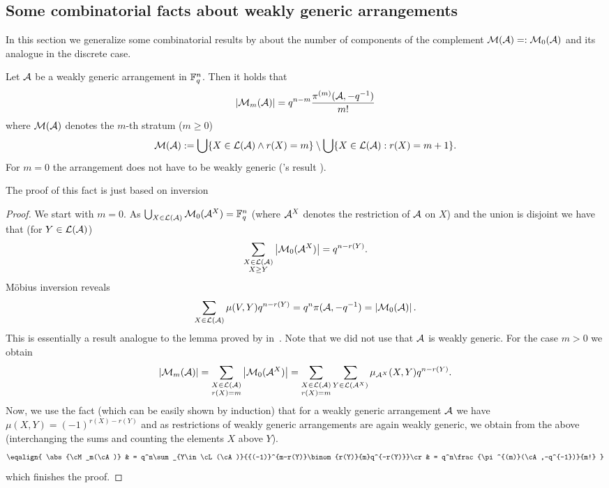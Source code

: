 
\subsection{Some combinatorial facts about weakly generic arrangements}

In this section we generalize some combinatorial results by  about the number of components of the complement $\mathcal{M}(\mathcal{A})=:\mathcal{M}_0(\mathcal{A})$ and its analogue in the discrete case.

\begin{lemma}
    Let $\mathcal{A}$ be a weakly generic arrangement in $\mathbb{F}_{q}^n$. Then it holds that
    $$
        \left|\mathcal{M}_m(\mathcal{A})\right|= q^{n-m}\frac{\pi^{(m)}(\mathcal{A},-q^{-1})}{m!}
    $$
    where $\mathcal{M}(\mathcal{A})$ denotes the $m$-th stratum ($m\geq 0$)
    $$        \mathcal{M}(\mathcal{A}):=\bigcup\{X\in\mathcal{L}(\mathcal{A})\wedge r(X)=m\}\setminus\bigcup\{X\in\mathcal{L}(\mathcal{A}):r(X)=m+1\}\text{.}
    $$
    For $m=0$ the arrangement does not have to be weakly generic ('s result \cite{zas}).
\end{lemma}

The proof of this fact is just based on  inversion

\begin{proof}
    We start with $m=0$.
    As $\bigcup_{X\in\mathcal{L}(\mathcal{A})}{\mathcal{M}_0(\mathcal{A}^X)}=\mathbb{F}_{q}^n$ (where $\mathcal{A}^X$ denotes the restriction of $\mathcal{A}$ on $X$) and the union is disjoint we have that (for $Y\in\mathcal{L}(\mathcal{A})$)
  $$
      \sum_{\substack{X\in\mathcal{L}(\mathcal{A})\\ X\geq Y}}{\left|\mathcal{M}_0(\mathcal{A}^X)\right|}=q^{n-r(Y)}\text{.}
  $$
  Möbius inversion reveals
  $$
      \sum_{X\in\mathcal{L}(\mathcal{A})}{\mu(V,Y)q^{n-r(Y)}} = q^n\pi(\mathcal{A},-q^{-1}) = \left|\mathcal{M}_0(\mathcal{A})\right|\text{.}
  $$
  This is essentially a result analogue to the lemma proved by  in~\cite{zas}. Note that we did not use that $\mathcal{A}$ is weakly generic.
  For the case $m>0$ we obtain
  $$
      \left|\mathcal{M}_m(\mathcal{A})\right|=\sum_{\substack{X\in\mathcal{L}(\mathcal{A})\\ r(X)=m}}{\left|\mathcal{M}_0(\mathcal{A}^X)\right|}=\sum_{\substack{X\in\mathcal{L}(\mathcal{A})\\ r(X)=m}}{\sum_{Y\in\mathcal{L}(\mathcal{A}^X)}{\mu_{\mathcal{A}^X}(X,Y)q^{n-r(Y)}}}\text{.}
  $$
  Now, we use the fact (which can be easily shown by induction) that for a weakly generic arrangement $\mathcal{A}$ we have $\mu(X,Y)={(-1)}^{r(X)-r(Y)}$ and as restrictions of weakly generic arrangements are again weakly generic, we obtain from the above (interchanging the sums and counting the elements $X$ above $Y$).
  $$\eqalign{
      \abs{\cM_m(\cA)}
      & = q^n\sum_{Y\in\cL(\cA)}{{(-1)}^{m-r(Y)}\binom{r(Y)}{m}q^{-r(Y)}}\cr
      & = q^n\frac{\pi^{(m)}(\cA,-q^{-1})}{m!}
  }
  $$
  which finishes the proof.
\end{proof}


